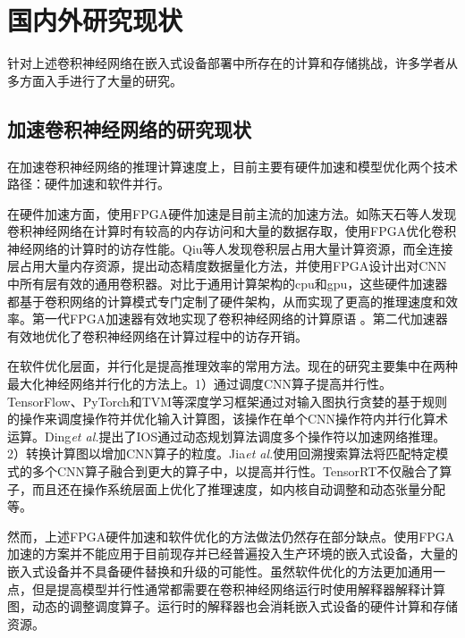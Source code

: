 \section{国内外研究现状}
针对上述卷积神经网络在嵌入式设备部署中所存在的计算和存储挑战，许多学者从多方面入手进行了大量的研究。
\subsection{加速卷积神经网络的研究现状}
在加速卷积神经网络的推理计算速度上，目前主要有硬件加速和模型优化两个技术路径：硬件加速和软件并行。

在硬件加速方面，使用FPGA硬件加速是目前主流的加速方法\cite{clement2011neuflow,farabet2009cnp,qadeer2013convolution,chen2014diannao,chen2014dadiannao,du2015shidiannao,chen2016eyeriss,qiu2016going}。如陈天石\cite{chen2014diannao}等人发现卷积神经网络在计算时有较高的内存访问和大量的数据存取，使用FPGA优化卷积神经网络的计算时的访存性能。Qiu\cite{qiu2016going}等人发现卷积层占用大量计算资源，而全连接层占用大量内存资源，提出动态精度数据量化方法，并使用FPGA设计出对CNN中所有层有效的通用卷积器。对比于通用计算架构的cpu和gpu，这些硬件加速器都基于卷积网络的计算模式专门定制了硬件架构，从而实现了更高的推理速度和效率。第一代FPGA加速器有效地实现了卷积神经网络的计算原语
\cite{clement2011neuflow,qadeer2013convolution,chakradhar2010dynamically}。第二代加速器有效地优化了卷积神经网络在计算过程中的访存开销\cite{chen2014diannao,chen2014dadiannao,du2015shidiannao,chen2016eyeriss,qiu2016going}。

在软件优化层面，并行化\cite{2020IOS,2018Optimizing,0OPTIMIZING}是提高推理效率的常用方法。现在的研究主要集中在两种最大化神经网络并行化的方法上。1）通过调度CNN算子提高并行性。TensorFlow\cite{2016TensorFlow}、PyTorch\cite{elmohamed}和TVM\cite{2018TVM}等深度学习框架通过对输入图执行贪婪的基于规则的操作来调度操作符并优化输入计算图，该操作在单个CNN操作符内并行化算术运算。Ding\textit{et al.}提出了IOS\cite{2020IOS}通过动态规划算法调度多个操作符以加速网络推理。2）转换计算图以增加CNN算子的粒度。Jia\textit{et al.}\cite{0OPTIMIZING}使用回溯搜索算法将匹配特定模式的多个CNN算子融合到更大的算子中，以提高并行性。TensorRT\cite{tensorRT}不仅融合了算子，而且还在操作系统层面上优化了推理速度，如内核自动调整和动态张量分配等。

然而，上述FPGA硬件加速和软件优化的方法做法仍然存在部分缺点。使用FPGA加速的方案并不能应用于目前现存并已经普遍投入生产环境的嵌入式设备，大量的嵌入式设备并不具备硬件替换和升级的可能性。虽然软件优化的方法更加通用一点，但是提高模型并行性通常都需要在卷积神经网络运行时使用解释器解释计算图，动态的调整调度算子。运行时的解释器也会消耗嵌入式设备的硬件计算和存储资源。


